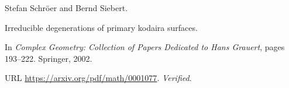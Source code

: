Stefan Schr{\"o}er and Bernd Siebert.

\newblock Irreducible degenerations of primary kodaira surfaces.

\newblock In \emph{Complex Geometry: Collection of Papers Dedicated to Hans
  Grauert}, pages 193--222. Springer, 2002.

\newblock URL \url{https://arxiv.org/pdf/math/0001077}.
\newblock \emph{Verified}.

